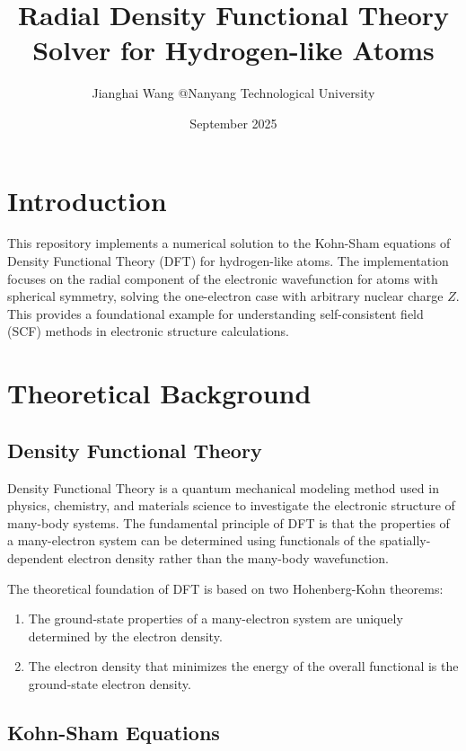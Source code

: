 \documentclass[12pt,a4paper]{article}
\title{Radial Density Functional Theory Solver for Hydrogen-like Atoms}
\author{Jianghai Wang @Nanyang Technological University}
\date{September 2025}
\begin{document}
\maketitle

\section{Introduction}

This repository implements a numerical solution to the Kohn-Sham equations of Density Functional Theory (DFT) for hydrogen-like atoms. The implementation focuses on the radial component of the electronic wavefunction for atoms with spherical symmetry, solving the one-electron case with arbitrary nuclear charge $Z$. This provides a foundational example for understanding self-consistent field (SCF) methods in electronic structure calculations.

\section{Theoretical Background}

\subsection{Density Functional Theory}

Density Functional Theory is a quantum mechanical modeling method used in physics, chemistry, and materials science to investigate the electronic structure of many-body systems. The fundamental principle of DFT is that the properties of a many-electron system can be determined using functionals of the spatially-dependent electron density rather than the many-body wavefunction.

The theoretical foundation of DFT is based on two Hohenberg-Kohn theorems:

\begin{enumerate}
    \item The ground-state properties of a many-electron system are uniquely determined by the electron density.
    \item The electron density that minimizes the energy of the overall functional is the ground-state electron density.
\end{enumerate}

\subsection{Kohn-Sham Equations}
\end{document}
